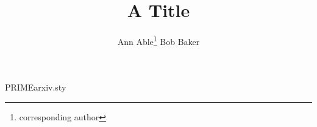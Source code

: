 \begin{filecontents*}[overwrite]{PRIMEarxiv.sty}
\providecommand{\maketitle}{}
\renewcommand{\maketitle}{%
  \par
  \begingroup
    \renewcommand{\thefootnote}{\fnsymbol{footnote}}
    \renewcommand{\@makefnmark}{\hbox to \z@{$^{\@thefnmark}$\hss}}
    \thispagestyle{empty}
    \@maketitle
    \@thanks
  \endgroup
  \let\maketitle\relax
  \let\thanks\relax
}
\providecommand{\@maketitle}{}
\renewcommand{\@maketitle}{\vbox{\hsize\textwidth\centering{\LARGE \@title\par}
  \def\And{\end{tabular}\hfil\linebreak[0]\hfil\begin{tabular}[t]{c}\ignorespaces}%
  \begin{tabular}[t]{c}\@author\end{tabular}}}
\end{filecontents*}
\documentclass{article}
\usepackage{PRIMEarxiv}
\title{A Title}
\author{Ann Able\thanks{corresponding author} \And Bob Baker}

\maketitle
Body.

